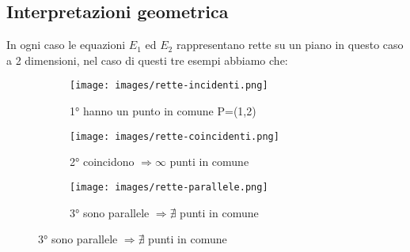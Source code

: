\subsection{Interpretazioni geometrica}
In ogni caso le equazioni $E_1$ ed $E_2$ rappresentano rette su un piano in questo caso a 2 dimensioni, nel caso di questi tre esempi abbiamo che:
\begin{figure}[h!]
    \centering
    \begin{subfigure}{.3\textwidth}
        \centering
        \texttt{[image: images/rette-incidenti.png]}
        \caption{1° hanno un punto in comune P=(1,2)}
    \end{subfigure}
    \hfill
    \begin{subfigure}{.3\textwidth}
        \centering
        \texttt{[image: images/rette-coincidenti.png]}
        \caption{2° coincidono $\Rightarrow \infty$ punti in comune}
    \end{subfigure}
    \hfill
    \begin{subfigure}{.3\textwidth}
        \centering
        \texttt{[image: images/rette-parallele.png]}
        \caption{3° sono parallele  $\Rightarrow \nexists$ punti in comune}
    \end{subfigure}
\end{figure}
\newpage
